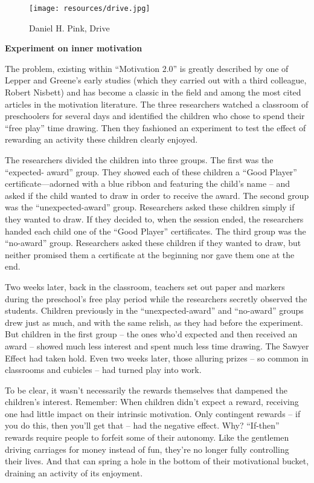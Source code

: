\begin{wrapfigure}{l}{0.4\textwidth}
    \centering
    \texttt{[image: resources/drive.jpg]}
    \caption[Daniel H. Pink, Drive]{Daniel H. Pink, Drive}
\end{wrapfigure}

\textbf{Experiment on inner motivation}

The problem, existing within ``Motivation 2.0'' is greatly described by one of Lepper and Greene’s early studies (which they carried out with a third colleague, Robert Nisbett) and has become a classic in the field and among the most cited articles in the motivation literature. The three researchers watched a classroom of preschoolers for several days and identified the children who chose to spend their ``free play'' time drawing. Then they fashioned an experiment to test the effect of rewarding an activity these children clearly enjoyed.

The researchers divided the children into three groups. The first was the ``expected- award'' group. They showed each of these children a ``Good Player'' certificate—adorned with a blue ribbon and featuring the child’s name -- and asked if the child wanted to draw in order to receive the award. The second group was the ``unexpected-award'' group. Researchers asked these children simply if they wanted to draw. If they decided to, when the session ended, the researchers handed each child one of the ``Good Player'' certificates. The third group was the ``no-award'' group. Researchers asked these children if they wanted to draw, but neither promised them a certificate at the beginning nor gave them one at the end.

Two weeks later, back in the classroom, teachers set out paper and markers during the preschool’s free play period while the researchers secretly observed the students. Children previously in the ``unexpected-award'' and ``no-award'' groups drew just as much, and with the same relish, as they had before the experiment. But children in the first group -- the ones who’d expected and then received an award -- showed much less interest and spent much less time drawing. The Sawyer Effect had taken hold. Even two weeks later, those alluring prizes -- so common in classrooms and cubicles -- had turned play into work.

To be clear, it wasn’t necessarily the rewards themselves that dampened the children’s interest. Remember: When children didn’t expect a reward, receiving one had little impact on their intrinsic motivation. Only contingent rewards -- if you do this, then you’ll get that -- had the negative effect. Why? ``If-then'' rewards require people to forfeit some of their autonomy. Like the gentlemen driving carriages for money instead of fun, they’re no longer fully controlling their lives. And that can spring a hole in the bottom of their motivational bucket, draining an activity of its enjoyment.

